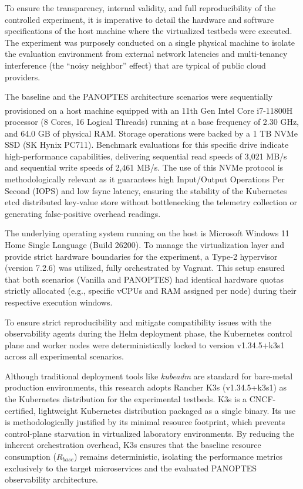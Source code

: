 To ensure the transparency, internal validity, and full reproducibility of the controlled experiment, it is imperative to detail the hardware and software specifications of the host machine where the virtualized testbeds were executed. The experiment was purposely conducted on a single physical machine to isolate the evaluation environment from external network latencies and multi-tenancy interference (the ``noisy neighbor'' effect) that are typical of public cloud providers.

The baseline and the PANOPTES architecture scenarios were sequentially provisioned on a host machine equipped with an 11th Gen Intel\textsuperscript{\tiny\textregistered} Core\textsuperscript{\tiny\texttrademark} i7-11800H processor (8 Cores, 16 Logical Threads) running at a base frequency of 2.30 GHz, and 64.0 GB of physical RAM. Storage operations were backed by a 1 TB NVMe SSD (SK Hynix PC711). Benchmark evaluations for this specific drive indicate high-performance capabilities, delivering sequential read speeds of 3,021 MB/s and sequential write speeds of 2,461 MB/s. The use of this NVMe protocol is methodologically relevant as it guarantees high Input/Output Operations Per Second (IOPS) and low fsync latency, ensuring the stability of the Kubernetes etcd distributed key-value store without bottlenecking the telemetry collection or generating false-positive overhead readings.

The underlying operating system running on the host is Microsoft Windows 11 Home Single Language (Build 26200). To manage the virtualization layer and provide strict hardware boundaries for the experiment, a Type-2 hypervisor (version 7.2.6) was utilized, fully orchestrated by Vagrant. This setup ensured that both scenarios (Vanilla and PANOPTES) had identical hardware quotas strictly allocated (e.g., specific vCPUs and RAM assigned per node) during their respective execution windows.

To ensure strict reproducibility and mitigate compatibility issues with the observability agents during the Helm deployment phase, the Kubernetes control plane and worker nodes were deterministically locked to version v1.34.5+k3s1 across all experimental scenarios.

Although traditional deployment tools like \textit{kubeadm} are standard for bare-metal production environments, this research adopts Rancher K3s (v1.34.5+k3s1) as the Kubernetes distribution for the experimental testbeds. K3s is a CNCF-certified, lightweight Kubernetes distribution packaged as a single binary. Its use is methodologically justified by its minimal resource footprint, which prevents control-plane starvation in virtualized laboratory environments. By reducing the inherent orchestration overhead, K3s ensures that the baseline resource consumption ($R_{base}$) remains deterministic, isolating the performance metrics exclusively to the target microservices and the evaluated PANOPTES observability architecture.